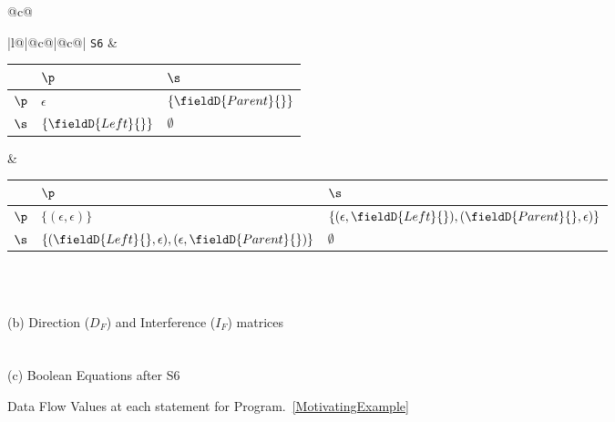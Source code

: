 \begin{figure}[h]
\begin{tabular}{@{}c@{}}
{\begin{tabular}[b]{|l@{}|@{}c@{}|@{}c@{}|}
{\tt S6} & 
\begin{tabular}{|p{3mm}|p{22mm}p{22mm}|} \hline 
            & $\p$  		& $\s$   \\ \hline
  $\p$ 	& $\epsilon$	& $\{\fieldD{Parent}{}\}$	 \\ \hline
  $\s$ 	& $\{\fieldD{Left}{}\}$	& $\emptyset$	\\ \hline
\end{tabular}
 &
\begin{tabular}{|p{3mm}|p{45mm}p{45mm}|} \hline 
            & $\p$  		& $\s$   \\ \hline
  $\p$ 	& $\{(\epsilon,\epsilon)\}$	&  $\{( \epsilon,\fieldD{Left}{}),(\fieldD{Parent}{},\epsilon)\}$	 \\ \hline
  $\s$ 	& $\{(\fieldD{Left}{}, \epsilon),(\epsilon,\fieldD{Parent}{})\}$		& $\emptyset$	\\ \hline
\end{tabular} \\ \hline

\end{tabular} 

}  \\
 \footnotesize (b) Direction ($D_F$) and Interference ($I_F$) matrices  \\ \\
  


 \\
\footnotesize (c) Boolean Equations after S6  \\    

\end{tabular}

\caption{Data Flow Values at each statement for Program.~\ref{MotivatingExample} }\label{fig:Code}
\end{figure}

